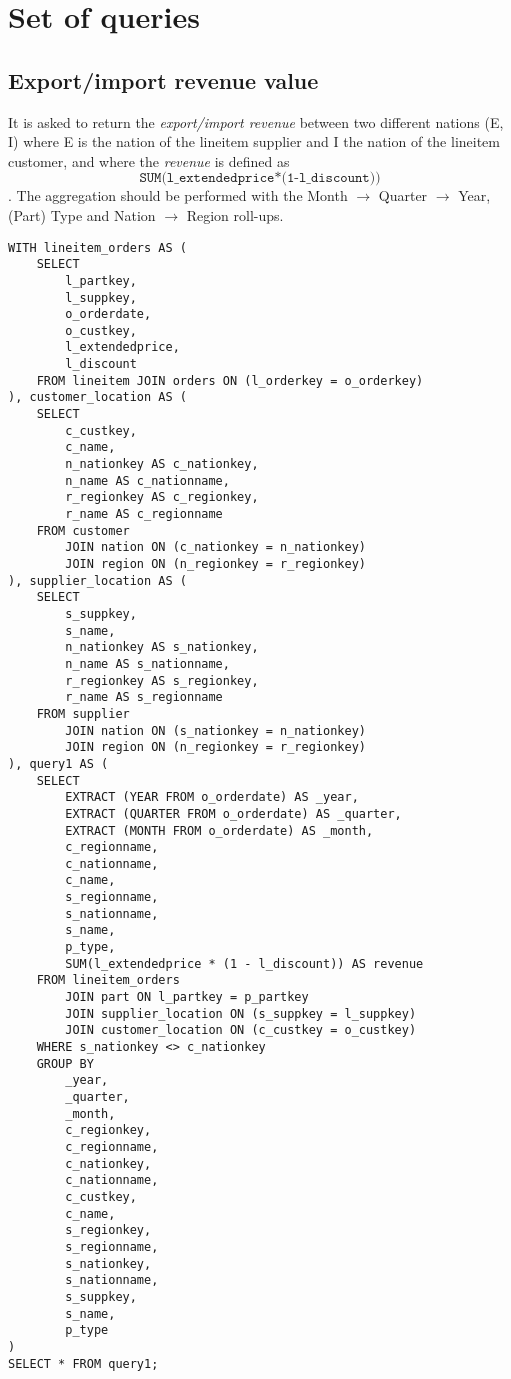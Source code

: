 

\section{Set of queries}

\subsection{Export/import revenue value}

It is asked to return the \textit{export/import revenue} between two different nations (E, I) where E is the nation of the lineitem supplier 
and I the nation of the lineitem customer, and where the \textit{revenue} is defined as $$ \texttt{SUM(l\_extendedprice*(1-l\_discount))}$$. 
The aggregation should be performed with the Month $\rightarrow$ Quarter $\rightarrow$ Year, (Part) Type and Nation $\rightarrow$ Region roll-ups.

\begin{lstlisting}
WITH lineitem_orders AS (
	SELECT 
		l_partkey, 
		l_suppkey, 
		o_orderdate, 
		o_custkey, 
		l_extendedprice, 
		l_discount
	FROM lineitem JOIN orders ON (l_orderkey = o_orderkey)
), customer_location AS (
	SELECT 
		c_custkey, 
		c_name, 
		n_nationkey AS c_nationkey, 
		n_name AS c_nationname, 
		r_regionkey AS c_regionkey, 
		r_name AS c_regionname 
	FROM customer 
		JOIN nation ON (c_nationkey = n_nationkey)
		JOIN region ON (n_regionkey = r_regionkey)
), supplier_location AS (
	SELECT 
		s_suppkey, 
		s_name, 
		n_nationkey AS s_nationkey, 
		n_name AS s_nationname, 
		r_regionkey AS s_regionkey, 
		r_name AS s_regionname 
	FROM supplier 
		JOIN nation ON (s_nationkey = n_nationkey)
		JOIN region ON (n_regionkey = r_regionkey)
), query1 AS (
	SELECT
		EXTRACT (YEAR FROM o_orderdate) AS _year,
		EXTRACT (QUARTER FROM o_orderdate) AS _quarter,
		EXTRACT (MONTH FROM o_orderdate) AS _month,
		c_regionname,
		c_nationname,
		c_name,
		s_regionname,
		s_nationname,
		s_name,
		p_type,
		SUM(l_extendedprice * (1 - l_discount)) AS revenue
	FROM lineitem_orders 
		JOIN part ON l_partkey = p_partkey
		JOIN supplier_location ON (s_suppkey = l_suppkey)
		JOIN customer_location ON (c_custkey = o_custkey)
	WHERE s_nationkey <> c_nationkey
	GROUP BY
		_year,
		_quarter,
		_month,
		c_regionkey,
		c_regionname,
		c_nationkey,
		c_nationname,
		c_custkey,
		c_name,
		s_regionkey,
		s_regionname,
		s_nationkey,
		s_nationname,
		s_suppkey,
		s_name,
		p_type
)
SELECT * FROM query1;
\end{lstlisting}



